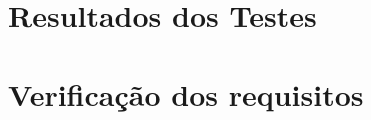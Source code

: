\documentclass[../monografia.tex]{subfiles}
\begin{document}

\section{Resultados dos Testes}
\section{Verificação dos requisitos}
\end{document}
